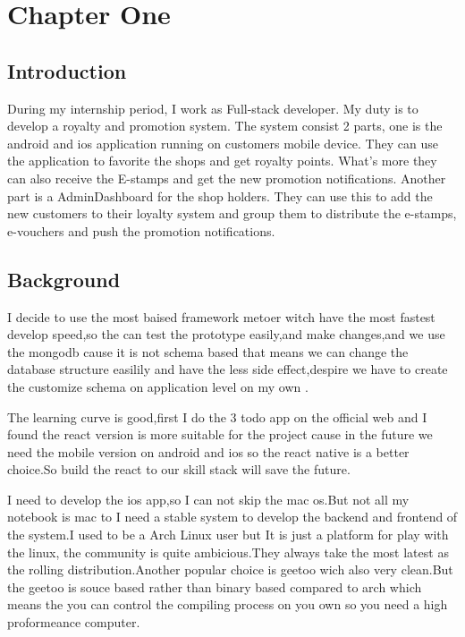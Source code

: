 \documentclass[12pt]{scrartcl}
\begin{document}
\newpage
\section{Chapter One}
\label{sec:orgc87e144}
\subsection{Introduction}
\label{sec:orgd68c741}
During my internship period, I work as Full-stack developer. My duty is to
develop a royalty and promotion system. The system consist 2 parts, one is
the android and ios application running on customers mobile device. They can
use the application to favorite the shops and get royalty points. What's more
they can also receive the E-stamps and get the new promotion notifications.
Another part is a AdminDashboard for the shop holders. They can use this to
add the new customers to their loyalty system and group them to distribute
the e-stamps, e-vouchers and push the promotion notifications.
\subsection{Background}
\label{sec:orga368f14}

I decide to use the most baised framework metoer witch have the most fastest
develop speed,so the can test the prototype easily,and make changes,and we use
the mongodb cause it is not schema based that means we can change the database
structure easilily and have the less side effect,despire we have to create the
customize schema on application level on my own .

The learning curve is good,first I do the 3 todo app on the official web and I
found the react version is more suitable for  the project cause in the future we
need the mobile version on android and ios so the react native is a better
choice.So build the react to our skill stack will save the future.

I need to develop the ios app,so I can not skip the mac os.But not all my notebook is mac to I need a stable system to develop the backend and frontend of the system.I used to be a Arch Linux user but It is just a platform for play with the linux, the community is quite ambicious.They always take the most latest as the rolling distribution.Another popular choice is geetoo wich also very clean.But the geetoo is souce based rather than binary based compared to arch which means the you can control the compiling process on you own so you need a high proformeance computer.
\end{document}
